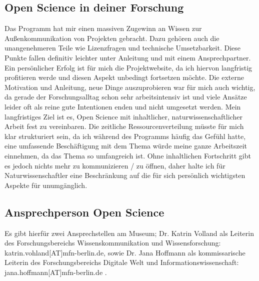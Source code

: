 \documentclass[11pt,a4paper]{article}
\begin{document}
\subsection{Open Science in deiner Forschung}
Das Programm hat mir einen massiven Zugewinn an Wissen zur Außenkommunikation von Projekten gebracht. Dazu gehören auch die unangenehmeren Teile wie Lizenzfragen und technische Umsetzbarkeit. Diese Punkte fallen definitiv leichter unter Anleitung und mit einem Ansprechpartner. Ein persönlicher Erfolg ist für mich die Projektwebsite, da ich hiervon langfristig profitieren werde und diesen Aspekt unbedingt fortsetzen möchte. Die externe Motivation und Anleitung, neue Dinge auszuprobieren war für mich auch wichtig, da gerade der Forschungsalltag schon sehr arbeitsintensiv ist und viele Ansätze leider oft als reine gute Intentionen enden und nicht umgesetzt werden. 
Mein langfristiges Ziel ist es, Open Science mit inhaltlicher, naturwissenschaftlicher Arbeit fest zu vereinbaren. Die zeitliche Ressourcenverteilung müsste für mich klar strukturiert sein, da ich während des Programms häufig das Gefühl hatte, eine umfassende Beschäftigung mit dem Thema würde meine ganze Arbeitszeit einnehmen, da das Thema so umfangreich ist. Ohne inhaltlichen Fortschritt gibt es jedoch nichts mehr zu kommunizieren / zu öffnen, daher halte ich für Naturwissenschaftler eine Beschränkung auf die für sich persönlich wichtigsten Aspekte für unumgänglich.


\subsection{Ansprechperson Open Science}
Es gibt hierfür zwei Ansprechstellen am Museum; Dr. Katrin Volland als Leiterin des Forschungsbereichs Wissenskommunikation und Wissensforschung: katrin.vohland[AT]mfn-berlin.de, sowie Dr. Jana Hoffmann als kommissarische Leiterin des Forschungsbereichs Digitale Welt und Informationswissenschaft: jana.hoffmann[AT]mfn-berlin.de .
\end{document}
